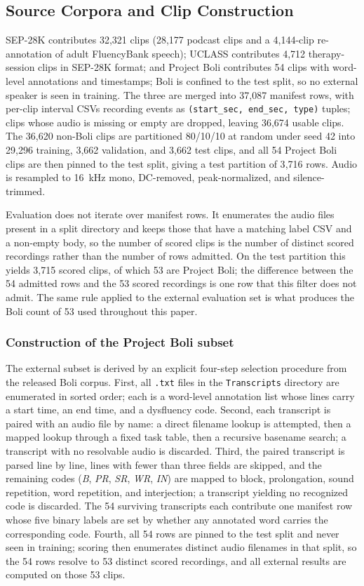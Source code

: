 \documentclass[a4paper,orivec]{llncs}
\begin{document}
\subsection{Source Corpora and Clip Construction}
SEP-28K contributes 32{,}321
clips (28{,}177 podcast clips and a 4{,}144-clip re-annotation of adult
FluencyBank speech); UCLASS contributes 4{,}712 therapy-session clips in
SEP-28K format; and Project Boli contributes 54 clips with word-level
annotations and timestamps; Boli is confined to the test split, so no external
speaker is seen in training. The three are merged into 37{,}087 manifest rows,
with per-clip interval CSVs recording events as
\texttt{(start\_sec, end\_sec, type)} tuples; clips whose audio is missing or
empty are dropped, leaving 36{,}674 usable clips. The 36{,}620 non-Boli clips
are partitioned 80/10/10 at random under seed 42 into 29{,}296 training, 3{,}662
validation, and 3{,}662 test clips, and all 54 Project Boli clips are then pinned
to the test split, giving a test partition of 3{,}716 rows. Audio is resampled
to 16~kHz mono, DC-removed, peak-normalized, and silence-trimmed.

Evaluation does not iterate over manifest rows. It enumerates the audio files
present in a split directory and keeps those that have a matching label CSV and
a non-empty body, so the number of scored clips is the number of distinct
scored recordings rather than the number of rows admitted. On the test partition
this yields 3{,}715 scored clips, of which 53 are Project Boli; the difference
between the 54 admitted rows and the 53 scored recordings is one row that this
filter does not admit. The same rule applied to the external evaluation set is
what produces the Boli count of 53 used throughout this paper.

\subsubsection{Construction of the Project Boli subset}
\label{sec:boli}
The external subset is derived by an explicit four-step selection procedure from
the released Boli corpus. First, all \texttt{.txt} files in the
\texttt{Transcripts} directory are
enumerated in sorted order; each is a word-level annotation list whose lines carry
a start time, an end time, and a dysfluency code. Second, each transcript is
paired with an audio file by name: a direct filename lookup is attempted, then a
mapped lookup through a fixed task table, then a recursive basename search; a
transcript with no resolvable audio is discarded. Third, the paired transcript is
parsed line by line, lines with fewer than three fields are skipped, and the
remaining codes (\emph{B}, \emph{PR}, \emph{SR}, \emph{WR}, \emph{IN}) are mapped
to block, prolongation, sound repetition, word repetition, and interjection; a
transcript yielding no recognized code is discarded. The 54 surviving transcripts
each contribute one manifest row whose five binary labels are set by whether any
annotated word carries the corresponding code. Fourth, all 54 rows are pinned to
the test split and never seen in training; scoring then enumerates distinct audio
filenames in that split, so the 54 rows resolve to 53 distinct scored recordings,
and all external results are computed on those 53 clips.
\end{document}
